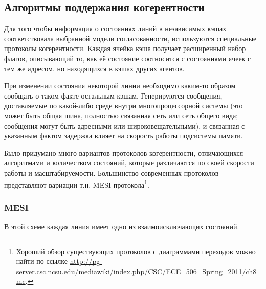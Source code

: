 \subsection[Алгоритмы поддержания когерентности]{Алгоритмы поддержания когерентности}

Для того чтобы информация о состояниях линий в независимых кэшах соответствовала выбранной модели согласованности, используются специальные протоколы когерентности. Каждая ячейка кэша получает расширенный набор флагов, описывающий то, как её состояние соотносится с состояниями ячеек с тем же адресом, но находящихся в кэшах других агентов.

При изменении состояния некоторой линии необходимо каким-то образом сообщать о таком факте остальным кэшам. Генерируются сообщения, доставляемые по какой-либо среде внутри многопроцессорной системы (это может быть общая шина, полностью связанная сеть или сеть общего вида; сообщения могут быть адресными или широковещательными), и связанная с указанным фактом задержка влияет на скорость работы подсистемы памяти.

Было придумано много вариантов протоколов когерентности, отличающихся алгоритмами и количеством состояний, которые различаются по своей скорости работы и масштабируемости. Большинство современных протоколов представляют вариации т.н. MESI-протокола\footnote{Хороший обзор существующих протоколов с диаграммами переходов можно найти по ссылке \url{http://pg-server.csc.ncsu.edu/mediawiki/index.php/CSC/ECE_506_Spring_2011/ch8_mc}.}.

\subsubsection{MESI}

В этой схеме каждая линия имеет одно из взаимоисключающих состояний.

